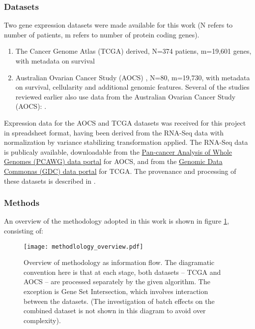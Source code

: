 \documentclass[tikz, 11pt,a4paper,oneside,fleqn]{article}
\begin{document}
\subsubsection{Datasets}
Two gene expression datasets were made available for this work (N refers to number of patients, m refers to number of protein coding genes).
\begin{enumerate}
\item The Cancer Genome Atlas (TCGA) derived, N=374 patiens, m=19,601 genes, with metadata on survival
\item Australian Ovarian Cancer Study (AOCS) \cite{Patch2015}, N=80, m=19,730, with metadata on survival, cellularity and additional genomic features. Several of the studies reviewed earlier also use data from the Australian Ovarian Cancer Study (AOCS): \cite{Patch2015,Ewing2020,Cuello2018,Au-Yeung2014}.
\end{enumerate}

Expression data for the AOCS and TCGA datasets was received for this project in spreadsheet format, having been derived from the RNA-Seq data with normalization by variance stabilizing transformation applied.  The RNA-Seq data is publicaly available, downloadable from  the \href{https://dcc.icgc.org/pcawg}{Pan-cancer Analysis of Whole Genomes (PCAWG) data portal} for AOCS, and from the \href{https://portal.gdc.cancer.gov/}{Genomic Data Commonas (GDC) data portal} for TCGA.  The provenance and processing of these datasets is described in \cite{Ewing2020}.


\subsubsection{Methods}
An overview of the methodology adopted in this work is shown in figure \ref{fig-method-overview}, consisting of:

\begin{figure}[htb!]
\begin{center}
\texttt{[image: methodlology\_overview.pdf]}
\end{center}
\caption{Overview of methodology as information flow.  The diagramatic convention here is that at each stage, both datasets -- TCGA and AOCS -- are processed separately by the given algorithm.  The exception is Gene Set Intersection, which involves interaction between the datasets.  (The investigation of batch effects on the combined dataset is not shown in this diagram to avoid over complexity). }
\label{fig-method-overview}
\end{figure}
\end{document}
